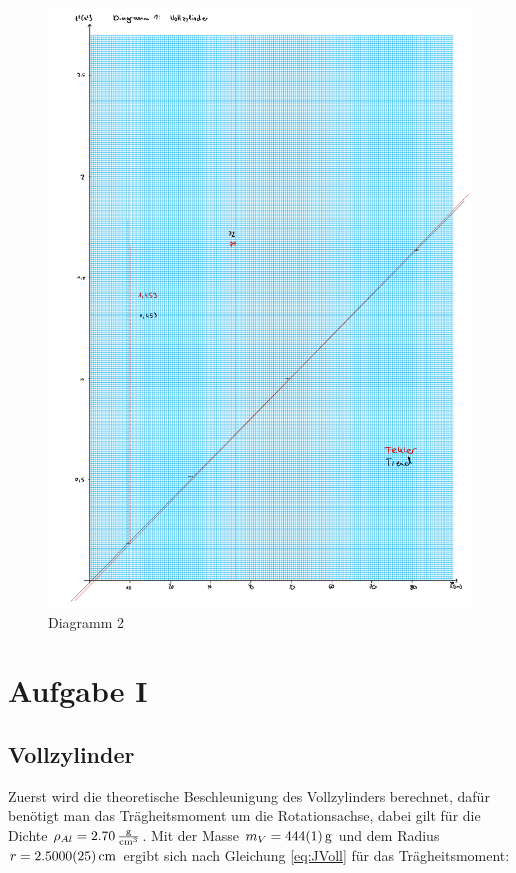 \begin{figure}[h!]
    \centering
    \includegraphics[page=2, width=1\textwidth,]{Diagramme15.pdf}
    \caption{Diagramm 2}
\end{figure}
\newpage



\section{Aufgabe I}
\subsection{Vollzylinder}

Zuerst wird die theoretische Beschleunigung des Vollzylinders berechnet, dafür benötigt man das Trägheitsmoment
um die Rotationsachse, dabei gilt für die Dichte $\rho_{Al} = \SI{2,70}{\frac{\gram}{\cm^3}}$.
Mit der Masse $m_V = \SI{444 \pm 1}{\gram}$ und dem Radius $r = \SI{2,5000\pm 0,0025}{\cm}$ ergibt sich nach Gleichung \ref{eq:JVoll} für das Trägheitsmoment:

